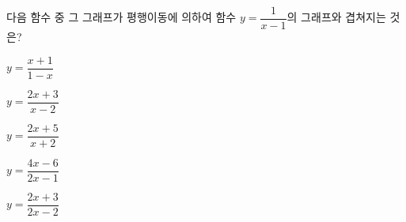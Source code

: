 \hspace*{2mm}\begin{minipage}[t]{\dimexpr\linewidth-2mm\relax}\vspace{0pt}
다음 함수 중 그 그래프가 평행이동에 의하여 함수 $y=\dfrac{1}{x-1}$의 그래프와 겹쳐지는 것은?
\begin{choices32}{\rule[-3ex]{0pt}{8ex}$y=\dfrac{x+1}{1-x}$}{\rule[-3ex]{0pt}{8ex}$y=\dfrac{2x+3}{x-2}$}{\rule[-3ex]{0pt}{8ex}$y=\dfrac{2x+5}{x+2}$}{\rule[-3ex]{0pt}{8ex}$y=\dfrac{4x-6}{2x-1}$}{\rule[-3ex]{0pt}{8ex}$y=\dfrac{2x+3}{2x-2}$}\end{choices32}\end{minipage}
